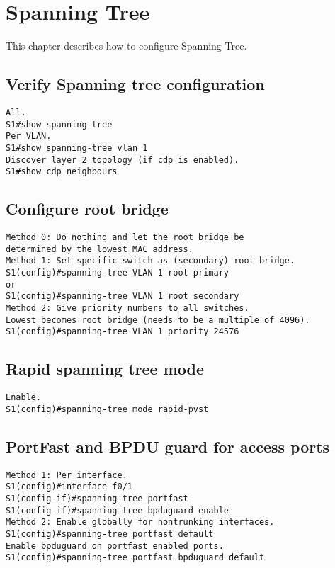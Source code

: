 \section{Spanning Tree}
This chapter describes how to configure Spanning Tree.
\subsection{Verify Spanning tree configuration}
\begin{verbatim}
All.
S1#show spanning-tree
Per VLAN.
S1#show spanning-tree vlan 1
Discover layer 2 topology (if cdp is enabled).
S1#show cdp neighbours
\end{verbatim}
\subsection{Configure root bridge}
\begin{verbatim}
Method 0: Do nothing and let the root bridge be 
determined by the lowest MAC address.
Method 1: Set specific switch as (secondary) root bridge.
S1(config)#spanning-tree VLAN 1 root primary
or 
S1(config)#spanning-tree VLAN 1 root secondary
Method 2: Give priority numbers to all switches. 
Lowest becomes root bridge (needs to be a multiple of 4096).
S1(config)#spanning-tree VLAN 1 priority 24576
\end{verbatim}
\subsection{Rapid spanning tree mode}
\begin{verbatim}
Enable.
S1(config)#spanning-tree mode rapid-pvst
\end{verbatim}
\subsection{PortFast and BPDU guard for access ports}
\begin{verbatim}
Method 1: Per interface.
S1(config)#interface f0/1
S1(config-if)#spanning-tree portfast
S1(config-if)#spanning-tree bpduguard enable
Method 2: Enable globally for nontrunking interfaces.
S1(config)#spanning-tree portfast default
Enable bpduguard on portfast enabled ports.
S1(config)#spanning-tree portfast bpduguard default
\end{verbatim}

